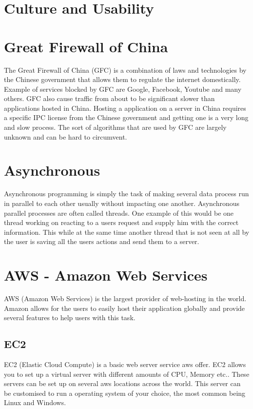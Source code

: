 \section{Culture and Usability}

\section{Great Firewall of China}
The Great Firewall of China (GFC) is a combination of laws and technologies by the Chinese government that allows them to regulate the internet domestically. Example of services blocked by GFC are Google, Facebook, Youtube and many others. GFC also cause traffic from about to be significant slower than applications hosted in China. Hosting a application on a server in China requires a specific IPC license from the Chinese government and getting one is a very long and slow process. The sort of algorithms that are used by GFC are largely unknown and can be hard to circumvent.
\section{Asynchronous}
Asynchronous programming is simply the task of making several data process run in parallel to each other usually without impacting one another. Asynchronous parallel processes are often called threads. One example of this would be one thread working on reacting to a users request and supply him with the correct information. This while at the same time another thread that is not seen at all by the user is saving all the users actions and send them to a server.

\section{AWS - Amazon Web Services}
AWS (Amazon Web Services) is the largest provider of web-hosting in the world. Amazon allows for the users to easily host their application globally and provide several features to help users with this task.
\subsection{EC2}
EC2 (Elastic Cloud Compute) is a basic web server service aws offer. EC2 allows you to set up a virtual server with different amounts of CPU, Memory etc.. These servers can be set up on several aws locations across the world. This server can be customised to run a operating system of your choice, the most common being Linux and Windows.
